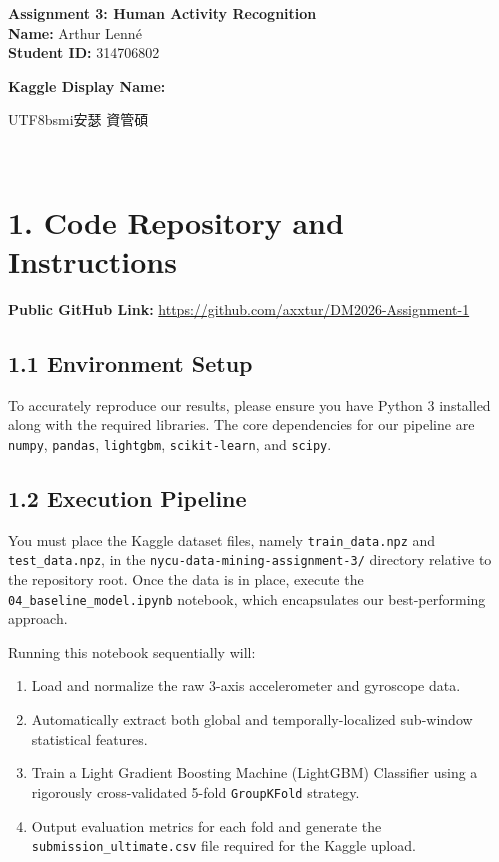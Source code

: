 \documentclass[12pt, a4paper]{article}
\begin{document}
\begin{center}
    \vspace*{1em}
    {\huge \textbf{\textcolor{nycublue}{Assignment 3: Human Activity Recognition}}} \\[1.5em]
    {\large \textbf{Name:} Arthur Lenné} \\[0.5em]
    {\large \textbf{Student ID:} 314706802} \\[0.5em]
    {\large \textbf{Kaggle Display Name:} \begin{CJK*}{UTF8}{bsmi}安瑟 資管碩\end{CJK*}} \\[2em]
\end{center}

\section*{1. Code Repository and Instructions}
\textbf{Public GitHub Link:} \href{https://github.com/axxtur/DM2026-Assignment-1}{https://github.com/axxtur/DM2026-Assignment-1}

\subsection*{1.1 Environment Setup}
To accurately reproduce our results, please ensure you have Python 3 installed along with the required libraries. The core dependencies for our pipeline are \texttt{numpy}, \texttt{pandas}, \texttt{lightgbm}, \texttt{scikit-learn}, and \texttt{scipy}. 

\subsection*{1.2 Execution Pipeline}
You must place the Kaggle dataset files, namely \texttt{train\_data.npz} and \texttt{test\_data.npz}, in the \texttt{nycu-data-mining-assignment-3/} directory relative to the repository root. Once the data is in place, execute the \texttt{04\_baseline\_model.ipynb} notebook, which encapsulates our best-performing approach. 

Running this notebook sequentially will:
\begin{enumerate}
    \item Load and normalize the raw 3-axis accelerometer and gyroscope data.
    \item Automatically extract both global and temporally-localized sub-window statistical features.
    \item Train a Light Gradient Boosting Machine (LightGBM) Classifier using a rigorously cross-validated 5-fold \texttt{GroupKFold} strategy.
    \item Output evaluation metrics for each fold and generate the \texttt{submission\_ultimate.csv} file required for the Kaggle upload.
\end{enumerate}
\end{document}
